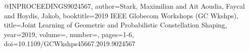 @INPROCEEDINGS{9024567,  author={Stark, Maximilian and Ait Aoudia, Faycal and Hoydis, Jakob},  booktitle={2019 IEEE Globecom Workshops (GC Wkshps)},   title={Joint Learning of Geometric and Probabilistic Constellation Shaping},   year={2019},  volume={},  number={},  pages={1-6},  doi={10.1109/GCWkshps45667.2019.9024567}}